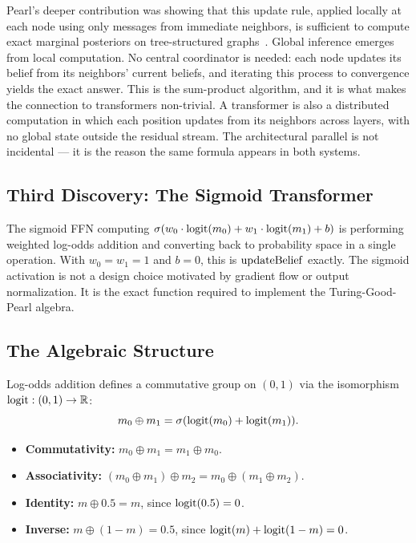 Pearl's deeper contribution was showing that this update rule, applied
locally at each node using only messages from immediate neighbors, is
sufficient to compute exact marginal posteriors on tree-structured
graphs~\cite{pearl1988probabilistic}. Global inference emerges from
local computation. No central coordinator is needed: each node updates
its belief from its neighbors' current beliefs, and iterating this
process to convergence yields the exact answer. This is the
sum-product algorithm, and it is what makes the connection to
transformers non-trivial. A transformer is also a distributed
computation in which each position updates from its neighbors across
layers, with no global state outside the residual stream. The
architectural parallel is not incidental --- it is the reason the same
formula appears in both systems.

\subsection*{Third Discovery: The Sigmoid Transformer}

The sigmoid FFN computing $\sigma(w_0 \cdot \operatorname{logit}(m_0) + w_1 \cdot \operatorname{logit}(m_1) + b)$ is performing weighted log-odds addition and converting back to probability space in a single operation. With $w_0 = w_1 = 1$ and $b = 0$, this is $\mathrm{updateBelief}$ exactly. The sigmoid activation is not a design choice motivated by gradient flow or output normalization. It is the exact function required to implement the Turing-Good-Pearl algebra.

\subsection*{The Algebraic Structure}

Log-odds addition defines a commutative group on $(0,1)$ via the isomorphism $\operatorname{logit} : (0,1) \to \mathbb{R}$:
\[
m_0 \oplus m_1 = \sigma(\operatorname{logit}(m_0) + \operatorname{logit}(m_1)).
\]

\begin{itemize}
\item \textbf{Commutativity:} $m_0 \oplus m_1 = m_1 \oplus m_0$.
\item \textbf{Associativity:} $(m_0 \oplus m_1) \oplus m_2 = m_0 \oplus (m_1 \oplus m_2)$.
\item \textbf{Identity:} $m \oplus 0.5 = m$, since $\operatorname{logit}(0.5) = 0$.
\item \textbf{Inverse:} $m \oplus (1-m) = 0.5$, since $\operatorname{logit}(m) + \operatorname{logit}(1-m) = 0$.
\end{itemize}

